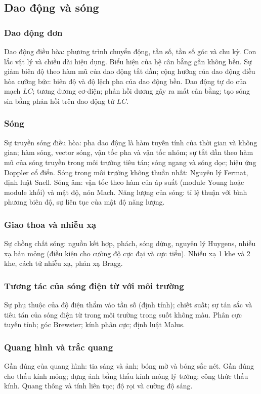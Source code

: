 \documentclass{article}
\begin{document}
\begin{multicols}{2}
\subsection{Dao động và sóng}
\subsubsection{Dao động đơn}
Dao động điều hòa: phương trình chuyển động, tần số, tần số góc và chu kỳ. Con lắc vật lý và chiều dài hiệu dụng. Biểu hiện của hệ cân bằng gần không bền. Sự giảm biên độ theo hàm mũ của dao động tắt dần; cộng hưởng của dao động điều hòa cưỡng bức: biên độ và độ lệch pha của dao động bền. Dao động tự do của mạch $LC$; tương đương cơ-điện; phản hồi dương gây ra mất cân bằng; tạo sóng sin bằng phản hồi trên dao động tử $LC$.

\subsubsection{Sóng}
Sự truyền sóng điều hòa: pha dao động là hàm tuyến tính của thời gian và không gian; hàm sóng, vector sóng, vận tốc pha và vận tốc nhóm; sự tắt dần theo hàm mũ của sóng truyền trong môi trường tiêu tán; sóng ngang và sóng dọc; hiệu ứng Doppler cổ điển. Sóng trong môi trường không thuần nhất: Nguyên lý Fermat, định luật Snell. Sóng âm: vận tốc theo hàm của áp suất (module Young hoặc module khối) và mật độ, nón Mach. Năng lượng của sóng: tỉ lệ thuận với bình phương biên độ, sự liên tục của mật độ năng lượng.

\subsubsection{Giao thoa và nhiễu xạ}
Sự chồng chất sóng: nguồn kết hợp, phách, sóng dừng, nguyên lý Huygens, nhiễu xạ bản mỏng (điều kiện cho cường độ cực đại và cực tiểu). Nhiễu xạ 1 khe và 2 khe, cách tử nhiễu xạ, phản xạ Bragg.

\subsubsection{Tương tác của sóng điện từ với môi trường}
Sự phụ thuộc của độ điện thẩm vào tần số (định tính); chiết suất; sự tán sắc và tiêu tán của sóng điện từ trong môi trường trong suốt không màu. Phân cực tuyến tính; góc Brewster; kính phân cực; định luật Malus.

\subsubsection{Quang hình và trắc quang}
Gần đúng của quang hình: tia sáng và ảnh; bóng mờ và bóng sắc nét. Gần đúng cho thấu kính mỏng; dựng ảnh bằng thấu kính mỏng lý tưởng; công thức thấu kính. Quang thông và tính liên tục; độ rọi và cường độ sáng.


\end{multicols}
\end{document}
